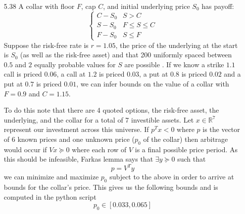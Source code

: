 \documentclass[12pt]{article}
\begin{document}
\begin{itemize}
  \item[5.38] A collar with floor $F$, cap $C$, and initial underlying price $S_0$ has payoff:
    $$
    \begin{cases}
      C - S_0 & S > C \\
      S - S_0 & F \leq S \leq C \\
      F - S_0 & S \leq F
    \end{cases}
    $$
    Suppose the risk-free rate is $r = 1.05$, the price of the underlying at the start is $S_0$ (as well as the risk-free asset) and that 200 uniformly spaced between $0.5$ and $2$ equally probable values for $S$ are possible .
    If we know a strike $1.1$ call is priced $0.06$, a call at $1.2$ is priced $0.03$, a put at $0.8$ is priced $0.02$ and a put at $0.7$ is priced $0.01$, we can infer bounds on the value of a collar with $F = 0.9$ and $C = 1.15$.

    To do this note that there are 4 quoted options, the risk-free asset, the underlying, and the collar for a total of 7 investible assets. Let $x \in \mathbb{R}^7$ represent our investment across this universe. If $p^Tx < 0$ where $p$ is the vector of 6 known prices and one unknown price ($p_0$ of the collar) then arbitrage would occur if $Vx \succeq 0$ where each row of $V$ is a final possible price period. As this should be infeasible, Farkas lemma says that $\exists y \succeq 0$ such that
    $$p = V^T y$$
    we can minimize and maximize $p_0$ subject to the above in order to arrive at bounds for the collar's price. This gives us the following bounds and is computed in the python script
    $$p_0 \in [0.033, 0.065]$$
    
  \end{itemize}
\end{document}
